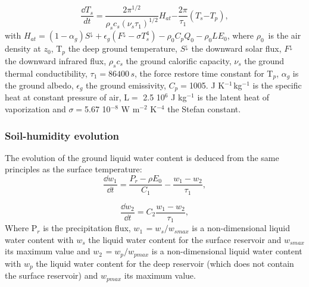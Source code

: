 \begin{equation}
\label{eq22}
\frac{\dd T_{s}}{dt}\mathrm{=}\frac{\mathrm{2}\pi^{\mathrm{1/2}}}{\rho
_{s}c_{s}\left( \nu_{s}\tau_{\mathrm{1}}
\right)^{\mathrm{1/2}}}H_{at}\mathrm{-}\frac{\mathrm{2}\pi }{\tau
_{\mathrm{1}}}\left( T_{s}\mathrm{-}T_{p} \right),
\end{equation}
\newline
with $H_{at}=\left( 1-\alpha_{g} \right)S^\downarrow +\epsilon
_{g}(F^\downarrow -\sigma T_{s}^{4})-\rho_{0}C_{p}Q_{0}-\rho_{0}LE_{0}$,
\newline
where $\rho_{0}\, $ is the air density at $z_{0}$, T$_{p}$ the deep ground temperature,
\newline
$S^\downarrow $ the downward solar flux, $F^\downarrow $ the downward infrared flux,
\newline
$\rho_{s}c_{s}$ the ground calorific capacity, $\nu_{s}$ the ground thermal conductibility,
\newline
$\tau_{\mathrm{1}}=86400\, s$, the force restore time constant for T$_{p}$,
\newline
$\alpha_{g}$ is the ground albedo, $\epsilon_{g}$ the ground emissivity,
\newline
$C_{p}=$1005. J K$^{-1\, }$kg$^{-1}$ is the specific heat at constant pressure of air,
\newline
L$=$ 2.5 10$^{6}$ J kg$^{-1}$ is the latent heat of vaporization and
\newline
$\sigma =$5.67 10$^{-8}$ W m$^{-2}$ K$^{-4}$ the Stefan constant.

\subsubsection{Soil-humidity evolution}
The evolution of the ground liquid water content is deduced from the same
principles as the surface temperature:
\begin{equation}
\label{eq23}
\frac{\dd w_{1}}{\dd t}=\frac{P_{r}-\rho E_{0}}{C_{1}}-\frac{w_{1}-w_{2}}{\tau
_{1}},
\end{equation}

\begin{equation}
\label{eq24}
\frac{\dd w_{2}}{\dd t}=C_{2}\frac{w_{1}-w_{2}}{\tau_{1}},
\end{equation}
Where P$_{r}$ is the precipitation flux,
\newline
$w_{1\, }= w_{s}/w_{smax}$ is a non-dimensional liquid water content with $w_{s}$ the liquid water content
for the surface reservoir and $w_{smax}$ its maximum value and
\newline
$w_{2\, }= w_{p}/w_{pmax}$ is a non-dimensional liquid water content with $w_{p}$ the liquid water content
for the deep reservoir (which does not contain the surface reservoir) and $w_{pmax}$ its maximum value.

